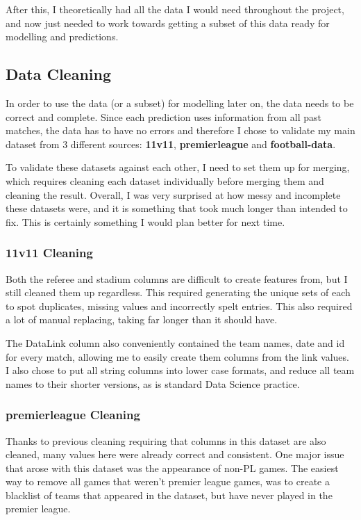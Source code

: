 \documentclass[12pt,a4paper,twoside,openright]{report}
\begin{document}
After this, I theoretically had all the data I would need throughout the project, and now just needed to work towards getting a subset of this data ready for modelling and predictions.

\subsection{Data Cleaning}

In order to use the data (or a subset) for modelling later on, the data needs to be correct and complete. Since each prediction uses information from all past matches, the data has to have no errors and therefore I chose to validate my main dataset from 3 different sources: \textbf{11v11}, \textbf{premierleague} and \textbf{football-data}. 

To validate these datasets against each other, I need to set them up for merging, which requires cleaning each dataset individually before merging them and cleaning the result. Overall, I was very surprised at how messy and incomplete these datasets were, and it is something that took much longer than intended to fix. This is certainly something I would plan better for next time.

\subsubsection{11v11 Cleaning}

Both the referee and stadium columns are difficult to create features from, but I still cleaned them up regardless. This required generating the unique sets of each to spot duplicates, missing values and incorrectly spelt entries. This also required a lot of manual replacing, taking far longer than it should have.

The DataLink column also conveniently contained the team names, date and id for every match, allowing me to easily create them columns from the link values. I also chose to put all string columns into lower case formats, and reduce all team names to their shorter versions, as is standard Data Science practice.

\subsubsection{premierleague Cleaning}

Thanks to previous cleaning requiring that columns in this dataset are also cleaned, many values here were already correct and consistent. One major issue that arose with this dataset was the appearance of non-PL games. The easiest way to remove all games that weren't premier league games, was to create a blacklist of teams that appeared in the dataset, but have never played in the premier league.
\end{document}
